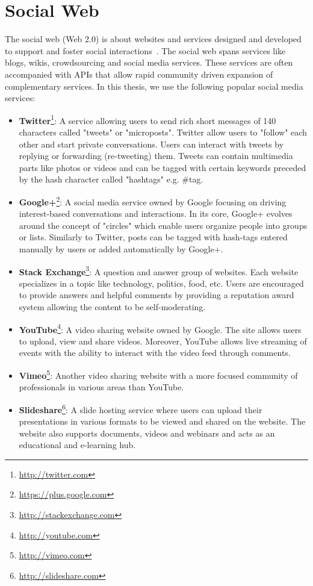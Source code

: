 \section{Social Web}\label{social-web}

The social web (Web 2.0) is about websites and services designed and developed to support and foster social interactions~\cite{Porter:NewRiders:08}. The social web spans services like blogs, wikis, crowdsourcing and social media services. These services are often accompanied with APIs that allow rapid community driven expansion of complementary services. In this thesis, we use the following popular social media services:

\begin{itemize}
	\item \textbf{Twitter}\footnote{\url{http://twitter.com}}: A service allowing users to send rich short messages of 140 characters called "tweets" or "microposts". Twitter allow users to "follow" each other and start private conversations. Users can interact with tweets by replying or forwarding (re-tweeting) them. Tweets can contain multimedia parts like photos or videos and can be tagged with certain keywords preceded by the hash character called "hashtags" e.g. \#tag.
	\item \textbf{Google+}\footnote{\url{https://plus.google.com}}: A social media service owned by Google focusing on driving interest-based conversations and interactions. In its core, Google+ evolves around the concept of "circles" which enable users organize people into groups or lists. Similarly to Twitter, posts can be tagged with hash-tags entered manually by users or added automatically by Google+.
	\item \textbf{Stack Exchange}\footnote{\url{http://stackexchange.com}}: A question and answer group of websites. Each website specializes in a topic like technology, politics, food, etc. Users are encouraged to provide answers and helpful comments by providing a reputation award system allowing the content to be self-moderating.
	\item \textbf{YouTube}\footnote{\url{http://youtube.com}}: A video sharing website owned by Google. The site allows users to upload, view and share videos. Moreover, YouTube allows live streaming of events with the ability to interact with the video feed through comments.
	\item \textbf{Vimeo}\footnote{\url{http://vimeo.com}}: Another video sharing website with a more focused community of professionals in various areas than YouTube.
	\item \textbf{Slideshare}\footnote{\url{http://slideshare.com}}: A slide hosting service where users can upload their presentations in various formats to be viewed and shared on the website. The website also supports documents, videos and webinars and acts as an educational and e-learning hub.
\end{itemize}

